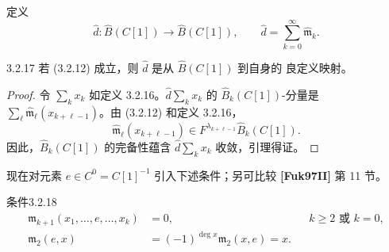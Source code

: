 定义
\[
  \widehat d\colon\widehat B(C[1])\longrightarrow\widehat B(C[1]),
  \qquad
  \widehat d=\sum_{k=0}^{\infty}\widehat{\mathfrak m}_k.
\]

\begin{lemma}{3.2.17}\label{lem:3-2-17}
若 (3.2.12) 成立，则 $\widehat d$ 是从 $\widehat B(C[1])$ 到自身的
良定义映射。
\end{lemma}

\begin{proof}
令 $\sum_kx_k$ 如定义 3.2.16。$\widehat d\sum_kx_k$ 的
$\widehat B_k(C[1])$-分量是
$\sum_\ell\widehat{\mathfrak m}_\ell(x_{k+\ell-1})$。由 (3.2.12) 和定义
3.2.16，
\[
  \widehat{\mathfrak m}_\ell(x_{k+\ell-1})
  \in F^{\lambda_{k+\ell-1}}\widehat B_k(C[1]).
\]
因此，$\widehat B_k(C[1])$ 的完备性蕴含
$\widehat d\sum_kx_k$ 收敛，引理得证。
\end{proof}

现在对元素 $e\in C^0=C[1]^{-1}$ 引入下述条件；另可比较
\textbf{[Fuk97II]} 第 11 节。

\begin{statement}{条件}{3.2.18}\label{cond:3-2-18}
\begin{align}
  \mathfrak m_{k+1}(x_1,\ldots,e,\ldots,x_k)&=0,
  &&k\geq2\text{ 或 }k=0,
  \tag{3.2.19.1}\label{eq:3-2-19-1}\\
  \mathfrak m_2(e,x)&=(-1)^{\deg x}\mathfrak m_2(x,e)=x.
  \tag{3.2.19.2}\label{eq:3-2-19-2}
\end{align}
\end{statement}

